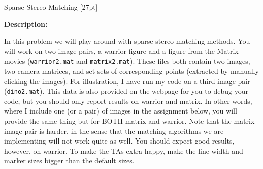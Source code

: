 \documentclass{assignment}
\begin{document}
\begin{problemlist}
\newpage
\pbitem Sparse Stereo Matching [27pt]

\textbf{Description:}

In this problem we will play around with sparse stereo matching methods. You will work on two image pairs, a warrior figure and a figure from the Matrix movies (\texttt{warrior2.mat} and \texttt{matrix2.mat}). These files both contain two images, two camera matrices, and set sets of corresponding points (extracted by manually clicking the images). For illustration, I have run my code on a third image pair (\texttt{dino2.mat}). This data is also provided on the webpage for you to debug your code, but you should only report results on warrior and matrix. In other words, where I include one (or a pair) of images in the assignment below, you will provide the same thing but for BOTH matrix and warrior. Note that the matrix image pair is harder, in the sense that the matching algorithms we are implementing will not work quite as well. You should expect good results, however, on warrior. To make the TAs extra happy, make the line width and marker sizes bigger than the default sizes.\\


\end{problemlist}
\end{document}
